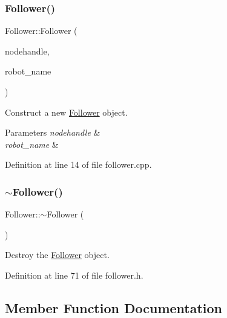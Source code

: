 \subsubsection{\texorpdfstring{Follower()}{Follower()}}
{\footnotesize\ttfamily Follower\+::\+Follower (\begin{DoxyParamCaption}\item[{ros\+::\+Node\+Handle $\ast$}]{nodehandle,  }\item[{const std\+::string \&}]{robot\+\_\+name }\end{DoxyParamCaption})}



Construct a new \hyperlink{class_follower}{Follower} object. 


\begin{DoxyParams}{Parameters}
{\em nodehandle} & \\
\hline
{\em robot\+\_\+name} & \\
\hline
\end{DoxyParams}


Definition at line 14 of file follower.\+cpp.

\mbox{\label{class_follower_a1dd55289af5ded7a57a2874c5477c33d}} 
\subsubsection{\texorpdfstring{$\sim$\+Follower()}{~Follower()}}
{\footnotesize\ttfamily Follower\+::$\sim$\+Follower (\begin{DoxyParamCaption}{ }\end{DoxyParamCaption})\hspace{0.3cm}{\ttfamily [inline]}}



Destroy the \hyperlink{class_follower}{Follower} object. 



Definition at line 71 of file follower.\+h.



\subsection{Member Function Documentation}
\mbox{\label{class_follower_a5573bec72ce4aed99706213154849b65}} 

